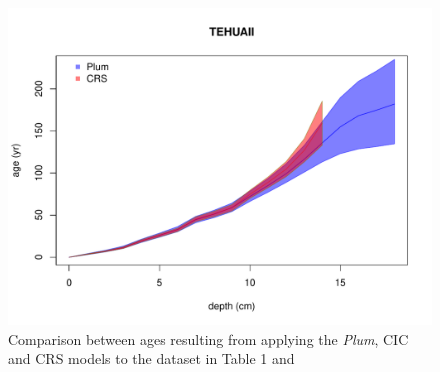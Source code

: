 \documentclass [10pt] {article}
\newcommand{\ac}{\color{red} }  %
\newcommand{\ca}{\color{black}} %
\begin{document}

\begin{figure}[h!]
 \centering
	\includegraphics[width=.75\linewidth]{TEHUAII-2.pdf}
	\caption{Comparison between ages resulting from applying the \textit{Plum}, CIC and CRS  models to the dataset in Table 1 and \citet{Sanchez-Cabeza2012}} 
  \label{fig:tehuaii}
\end{figure}


\end{document}
